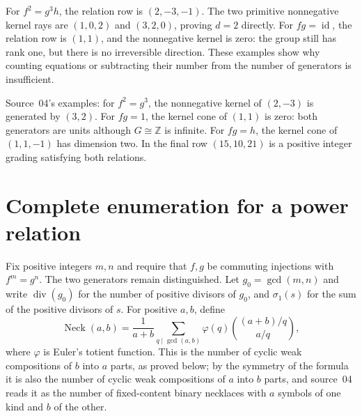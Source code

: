 \documentclass[11pt,letterpaper]{article}
\numberwithin{equation}{section}
\theoremstyle{plain}
\theoremstyle{definition}
\theoremstyle{remark}
\newcommand{\ZZ}{\mathbb Z}
\newcommand{\id}{\operatorname{id}}
\newcommand{\Neck}{\operatorname{Neck}}
\begin{document}
For $f^2=g^3h$, the relation row is $(2,-3,-1)$. The two primitive
nonnegative kernel rays are $(1,0,2)$ and $(3,2,0)$, proving $d=2$ directly.
For $fg=\id$, the relation row is $(1,1)$, and the nonnegative kernel is zero:
the group still has rank one, but there is no irreversible direction. These
examples show why counting equations or subtracting their number from the
number of generators is insufficient.

Source~04's examples: for $f^2=g^3$, the nonnegative kernel of $(2,-3)$
is generated by $(3,2)$. For $fg=1$, the kernel cone
of $(1,1)$ is zero: both generators are units although
$G\cong\ZZ$ is infinite. For $fg=h$, the kernel cone
of $(1,1,-1)$ has dimension two. In the final row
$(15,10,21)$ is a positive integer grading satisfying
both relations.

\section{Complete enumeration for a power relation}\label{nee:aa:sec:power}
\label{nee:ci:sec:enumeration}

Fix positive integers $m,n$ and require that $f,g$ be commuting injections
with $f^m=g^n$. The two generators remain distinguished. Let $g_0=\gcd(m,n)$ and write $\operatorname{div}(g_0)$ for
the number of positive divisors of $g_0$, and $\sigma_1(s)$ for the sum of the positive divisors of $s$. For positive $a,b$, define
\begin{equation}\label{nee:aa:eq:necklace}
\Neck(a,b)=\frac{1}{a+b}
\sum_{q\mid\gcd(a,b)}\varphi(q)
\binom{(a+b)/q}{a/q},
\end{equation}
where $\varphi$ is Euler's totient function. This is the number of cyclic weak
compositions of $b$ into $a$ parts, as proved below; by the symmetry of the formula it is also the number of cyclic weak compositions of $a$ into $b$ parts, and source~04 reads it as the number of fixed-content binary necklaces with
$a$ symbols of one kind and $b$ of the other.
\end{document}
